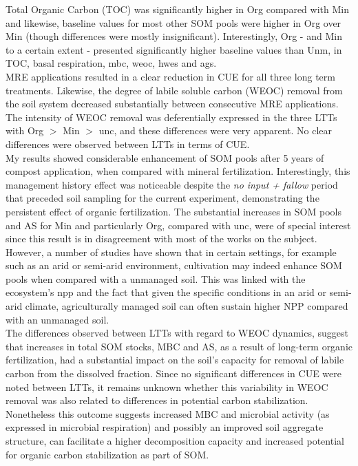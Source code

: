 \documentclass[12pt]{report}
\begin{document}
	    Total Organic Carbon (TOC) was significantly higher in Org compared with Min and likewise, baseline values  for most other SOM pools were higher in Org over Min (though differences were mostly insignificant). Interestingly, Org - and Min to a certain extent - presented significantly higher baseline values than Unm, in TOC, basal respiration, \gls{mbc}, \gls{weoc}, \gls{hwes} and \gls{ags}.\\ 
	    MRE applications resulted in a clear reduction in CUE for all three long term treatments. Likewise, the degree of labile soluble carbon (WEOC) removal from the soil system decreased substantially between consecutive MRE applications. The intensity of WEOC removal was deferentially expressed in the three LTTs with Org $  > $ Min $ > $ \gls{unc}, and these differences were very apparent. No clear differences were observed between LTTs in terms of CUE.\\
	    My results showed considerable enhancement of SOM pools after 5 years of compost application, when compared with mineral fertilization. Interestingly, this management history effect was noticeable despite the \textit{no input + fallow} period that preceded soil sampling for the current experiment, demonstrating the persistent effect of organic fertilization. The substantial increases in SOM pools and AS for Min and particularly Org, compared with \gls{unc}, were of special interest since this result is in disagreement with most  of the works on the subject. However, a number of studies have shown that in certain settings, for example such as an arid or semi-arid environment, cultivation may indeed enhance SOM pools when compared with a unmanaged soil. This was linked with the ecosystem's \gls{npp} and the fact that given the specific conditions in an arid or semi-arid climate, agriculturally managed soil can often sustain higher NPP compared with an unmanaged soil.\\
	    The differences observed between LTTs with regard to WEOC dynamics, suggest that increases in total SOM stocks, MBC and AS, as a result of long-term organic fertilization, had a substantial impact on the soil's capacity for removal of labile carbon from the dissolved fraction. Since no significant differences in CUE were noted between LTTs, it remains unknown whether this variability in WEOC removal was also related to differences in potential carbon stabilization. Nonetheless this outcome suggests increased MBC and microbial activity (as expressed in microbial respiration) and possibly an improved soil aggregate structure, can facilitate a higher decomposition capacity and increased potential for organic carbon stabilization as part of SOM.\\
\end{document}
